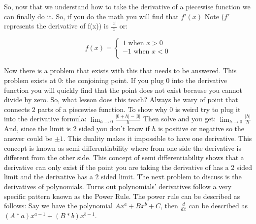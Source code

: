 \documentclass{article}
\begin{document}
\newline
\newline
So, now that we understand how to take the derivative of a piecewise function we can finally do it. So, if you do the math you will find that $f'(x)$ Note ($f'$ represents the derivative of f(x)) is $\frac{|x|}{x}$ or:
\begin{center}
    \[  f(x) = \left\{ 
\begin{array}{ll}
    
      1 \text{ when } x > 0 \\
      -1 \text{ when } x < 0 \\
\end{array} 
\right. \]
\end{center}
Now there is a problem that exists with this that needs to be answered. This problem exists at $0$: the conjoining point. If you plug $0$ into the derivative function you will quickly find that the point does not exist because you cannot divide by zero. So, what lesson does this teach? Always be wary of point that connects 2 parts of a piecewise function.  
\newline
\newline
To show why $0$ is weird try to plug it into the derivative formula:
$\lim_{h\to 0}\frac{|0+h| -  |0|}{h}$
\newline
\newline
Then solve and you get:
$\lim_{h\to 0}\frac{|h|}{h}$
\newline
\newline
And, since the limit is 2 sided you don't know if $h$ is positive or negative so the answer could be $\pm 1$. This duality makes it impossible to have one derivative. This concept is known as semi differentiability where from one side the derivative is different from the other side. This concept of semi differentiability shows that a derivative can only exist if the point you are taking the derivative of has a 2 sided limit and the derivative has a 2 sided limit.
\newline
\newline
The next problem to discuss is the derivatives of polynomials. Turns out polynomials' derivatives follow a very specific pattern known as the Power Rule. The power rule can be described as follows: Say we have the polynomial $Ax^a + Bx^b + C$, then $\frac{d}{dx}$ can be described as $(A*a)x^{a-1} + (B*b)x^{b-1}$. 
\newline
\newline
\end{document}
